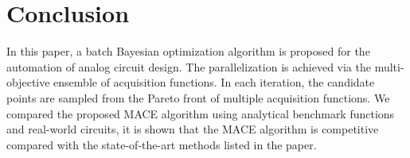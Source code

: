 \section{Conclusion}

In this paper, a batch Bayesian optimization algorithm is proposed for the
automation of analog circuit design. The parallelization is achieved via
the multi-objective ensemble of acquisition functions. In each iteration, the
candidate points are sampled from the Pareto front of multiple acquisition
functions. We compared the proposed MACE algorithm using analytical benchmark
functions and real-world circuits, it is shown that the MACE algorithm is
competitive compared with the state-of-the-art methods listed in the paper.
